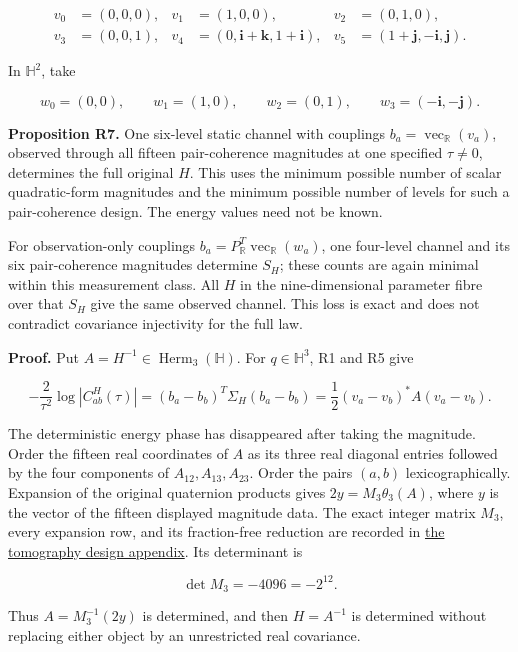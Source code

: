\documentclass[
  11pt,
]{article}
\begin{document}
\[
\begin{aligned}
v_0&=(0,0,0),&v_1&=(1,0,0),&v_2&=(0,1,0),\\
v_3&=(0,0,1),&v_4&=(0,\mathbf i+\mathbf k,1+\mathbf i),
&v_5&=(1+\mathbf j,-\mathbf i,\mathbf j).
\end{aligned}
\]

In \(\mathbb H^2\), take

\[
w_0=(0,0),\qquad w_1=(1,0),\qquad w_2=(0,1),
\qquad w_3=(-\mathbf i,-\mathbf j).
\]

\textbf{Proposition R7.} One six-level static channel with couplings
\(b_a=\operatorname{vec}_{\mathbb R}(v_a)\), observed through all
fifteen pair-coherence magnitudes at one specified \(\tau\ne0\),
determines the full original \(H\). This uses the minimum possible
number of scalar quadratic-form magnitudes and the minimum possible
number of levels for such a pair-coherence design. The energy values
need not be known.

For observation-only couplings
\(b_a=P_{\mathbb R}^T\operatorname{vec}_{\mathbb R}(w_a)\), one
four-level channel and its six pair-coherence magnitudes determine
\(S_H\); these counts are again minimal within this measurement class.
All \(H\) in the nine-dimensional parameter fibre over that \(S_H\) give
the same observed channel. This loss is exact and does not contradict
covariance injectivity for the full law.

\textbf{Proof.} Put \(A=H^{-1}\in\operatorname{Herm}_3(\mathbb H)\). For
\(q\in\mathbb H^3\), R1 and R5 give

\[
-\frac{2}{\tau^2}\log|C_{ab}^H(\tau)|
=(b_a-b_b)^T\Sigma_H(b_a-b_b)
=\frac12(v_a-v_b)^*A(v_a-v_b).
\]

The deterministic energy phase has disappeared after taking the
magnitude. Order the fifteen real coordinates of \(A\) as its three real
diagonal entries followed by the four components of
\(A_{12},A_{13},A_{23}\). Order the pairs \((a,b)\) lexicographically.
Expansion of the original quaternion products gives
\(2y=M_3\theta_3(A)\), where \(y\) is the vector of the fifteen
displayed magnitude data. The exact integer matrix \(M_3\), every
expansion row, and its fraction-free reduction are recorded in
\href{TOMOGRAPHY_DESIGN.md}{the tomography design appendix}. Its
determinant is

\[
\det M_3=-4096=-2^{12}.
\]

Thus \(A=M_3^{-1}(2y)\) is determined, and then \(H=A^{-1}\) is
determined without replacing either object by an unrestricted real
covariance.
\end{document}
